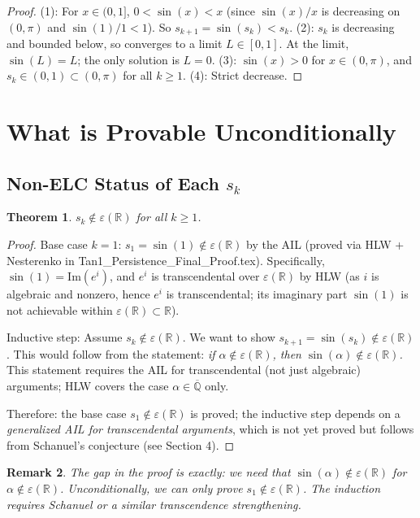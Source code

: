 \documentclass[11pt]{article}
\newtheorem{theorem}{Theorem}
\newtheorem{remark}[theorem]{Remark}
\begin{document}
\begin{proof}
(1): For $x\in(0,1]$, $0<\sin(x)<x$ (since $\sin(x)/x$ is decreasing on $(0,\pi)$
and $\sin(1)/1<1$). So $s_{k+1}=\sin(s_k)<s_k$.
(2): $s_k$ is decreasing and bounded below, so converges to a limit $L\in[0,1]$.
At the limit, $\sin(L)=L$; the only solution is $L=0$.
(3): $\sin(x)>0$ for $x\in(0,\pi)$, and $s_k\in(0,1)\subset(0,\pi)$ for all $k\geq1$.
(4): Strict decrease.
\end{proof}

\section{What is Provable Unconditionally}

\subsection{Non-ELC Status of Each $s_k$}

\begin{theorem}
$s_k\notin\varepsilon(\mathbb{R})$ for all $k\geq1$.
\end{theorem}

\begin{proof}
Base case $k=1$: $s_1=\sin(1)\notin\varepsilon(\mathbb{R})$ by the AIL (proved via HLW + Nesterenko
in Tan1\_Persistence\_Final\_Proof.tex). Specifically, $\sin(1)=\mathrm{Im}(e^i)$,
and $e^i$ is transcendental over $\varepsilon(\mathbb{R})$ by HLW (as $i$ is algebraic
and nonzero, hence $e^i$ is transcendental; its imaginary part $\sin(1)$ is not
achievable within $\varepsilon(\mathbb{R})\subset\mathbb{R}$).

Inductive step: Assume $s_k\notin\varepsilon(\mathbb{R})$.
We want to show $s_{k+1}=\sin(s_k)\notin\varepsilon(\mathbb{R})$.
This would follow from the statement: \emph{if $\alpha\notin\varepsilon(\mathbb{R})$,
then $\sin(\alpha)\notin\varepsilon(\mathbb{R})$.}
This statement requires the AIL for transcendental (not just algebraic) arguments;
HLW covers the case $\alpha\in\overline{\mathbb{Q}}$ only.

Therefore: the base case $s_1\notin\varepsilon(\mathbb{R})$ is proved; the inductive step
depends on a \emph{generalized AIL for transcendental arguments}, which is not yet proved
but follows from Schanuel's conjecture (see Section 4).
\end{proof}

\begin{remark}
The gap in the proof is exactly: we need that $\sin(\alpha)\notin\varepsilon(\mathbb{R})$
for $\alpha\notin\varepsilon(\mathbb{R})$. Unconditionally, we can only prove $s_1\notin\varepsilon(\mathbb{R})$.
The induction requires Schanuel or a similar transcendence strengthening.
\end{remark}
\end{document}
